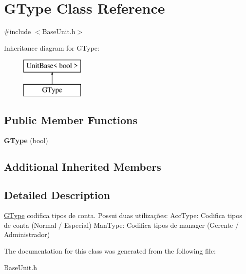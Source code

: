 \hypertarget{classGType}{\section{G\-Type Class Reference}
\label{classGType}
}


{\ttfamily \#include $<$Base\-Unit.\-h$>$}

Inheritance diagram for G\-Type\-:\begin{figure}[H]
\begin{center}
\leavevmode
\includegraphics[height=2.000000cm]{classGType}
\end{center}
\end{figure}
\subsection*{Public Member Functions}
\begin{DoxyCompactItemize}
\item 
\hypertarget{classGType_a5ab14b6dd6554361e36353ac2b4f9b7d}{{\bfseries G\-Type} (bool)}\label{classGType_a5ab14b6dd6554361e36353ac2b4f9b7d}

\end{DoxyCompactItemize}
\subsection*{Additional Inherited Members}


\subsection{Detailed Description}
\hyperlink{classGType}{G\-Type} codifica tipos de conta. Possui duas utilizações\-: Acc\-Type\-: Codifica tipos de conta (Normal / Especial) Man\-Type\-: Codifica tipos de manager (Gerente / Administrador) 

The documentation for this class was generated from the following file\-:\begin{DoxyCompactItemize}
\item 
Base\-Unit.\-h\end{DoxyCompactItemize}
